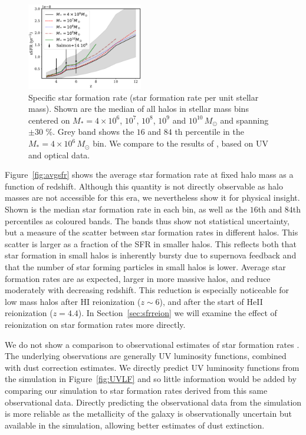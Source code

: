 \documentclass[fleqn,usenatbib]{mnras}
\def\msun{\, M_{\odot}}
\begin{document}
\begin{figure}
\centering
    \includegraphics[width=0.45\textwidth]{plots/ssfr.pdf}
  \caption{Specific star formation rate (star formation rate per unit stellar mass). Shown are the median of all halos in stellar mass bins centered on $M_* = 4\times 10^{6}$, $10^{7}$, $10^{8}$, $10^9$ and $10^{10} \msun$ and spanning $\pm 30$ \protect\%. Grey band shows the $16$ and $84$ th percentile in the $M_* = 4\times 10^6 \msun$ bin. We compare to the results of \cite{2015ApJ...799..183S}, based on UV and optical data.}
  \label{fig:ssfr}
\end{figure}

Figure~\ref{fig:avgsfr} shows the average star formation rate at fixed halo mass as a function of redshift. Although this quantity is not directly observable as halo masses are not accessible for this era, we nevertheless show it for physical insight. Shown is the median star formation rate in each bin, as well as the $16$th and $84$th percentiles as coloured bands. The bands thus show not statistical uncertainty, but a measure of the scatter between star formation rates in different halos. This scatter is larger as a fraction of the SFR in smaller halos. This reflects both that star formation in small halos is inherently bursty due to supernova feedback and that the number of star forming particles in small halos is lower. Average star formation rates are as expected, larger in more massive halos, and reduce moderately with decreasing redshift. This reduction is especially noticeable for low mass halos after HI reionization ($z \sim 6$), and after the start of HeII reionization ($z=4.4$). In Section~\ref{sec:sfrreion} we will examine the effect of reionization on star formation rates more directly.

We do not show a comparison to observational estimates of star formation rates \citep[see][for a review]{2013ApJ...770...57B}. The underlying observations are generally UV luminosity functions, combined with dust correction estimates. We directly predict UV luminosity functions from the simulation in Figure~\ref{fig:UVLF} and so little information would be added by comparing our simulation to star formation rates derived from this same observational data. Directly predicting the observational data from the simulation is more reliable as the metallicity of the galaxy is observationally uncertain but available in the simulation, allowing better estimates of dust extinction.
\end{document}
